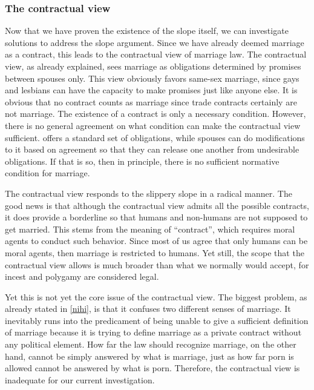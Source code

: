 \documentclass[man,floatsintext]{apa7}
\begin{document}
\subsubsection{The contractual view}

Now that we have proven the existence of the slope itself, we can investigate solutions to address the slope argument. Since we have already deemed marriage as a contract, this leads to the contractual view of marriage law. The contractual view, as already explained, sees marriage as obligations determined by promises between spouses only.\autocite{brakeMarriageDomesticPartnership2023} This view obviously favors same-sex marriage, since gays and lesbians can have the capacity to make promises just like anyone else. It is obvious that no contract counts as marriage since trade contracts certainly are not marriage. The existence of a contract is only a necessary condition. However, there is no general agreement on what condition can make the contractual view sufficient.\autocite{morseWhyUnilateralDivorce2006,houlgateChildrenRightsState2005} \textcite{wasserstromAdulteryImmoral1974} offers a standard set of obligations, while spouses can do modifications to it based on agreement so that they can release one another from undesirable obligations. If that is so, then in principle, there is no sufficient normative condition for marriage.

The contractual view responds to the slippery slope in a radical manner. The good news is that although the contractual view admits all the possible contracts, it does provide a borderline so that humans and non-humans are not supposed to get married. This stems from the meaning of ``contract'', which requires moral agents to conduct such behavior. Since most of us agree that only humans can be moral agents, then marriage is restricted to humans. Yet still, the scope that the contractual view allows is much broader than what we normally would accept, for incest and polygamy are considered legal.

Yet this is not yet the core issue of the contractual view. The biggest problem, as already stated in \ref{nihi}, is that it confuses two different senses of marriage. It inevitably runs into the predicament of being unable to give a sufficient definition of marriage because it is trying to define marriage as a private contract without any political element. How far the law should recognize marriage, on the other hand, cannot be simply answered by what is marriage, just as how far porn is allowed cannot be answered by what is porn. Therefore, the contractual view is inadequate for our current investigation.
\end{document}

